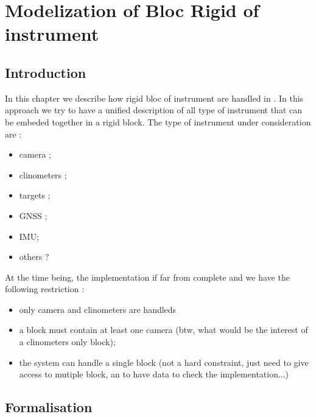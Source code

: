 \chapter{Modelization of Bloc Rigid of instrument}



\section{Introduction}

In this chapter we describe how rigid bloc of instrument are handled in \PPP. In this approach
we try to have a unified description of all type of instrument that can be embeded
together in a rigid block. The type of instrument under consideration are :

\begin{itemize}
   \item   camera ;
   \item   clinometers ;
   \item   targets ;
   \item   GNSS ;
   \item   IMU;
   \item   others ?
\end{itemize}

At the time being, the implementation if far from complete and we have 
the following restriction :

\begin{itemize}
   \item   only camera and clinometers are handleds
   \item   a block must contain at least one camera  (btw, what would be the interest of a clinometers only block);
   \item   the system can handle a single block (not a hard constraint, just need to give access to mutiple block, an to have data
           to check the implementation...)
\end{itemize}




\section{Formalisation}

